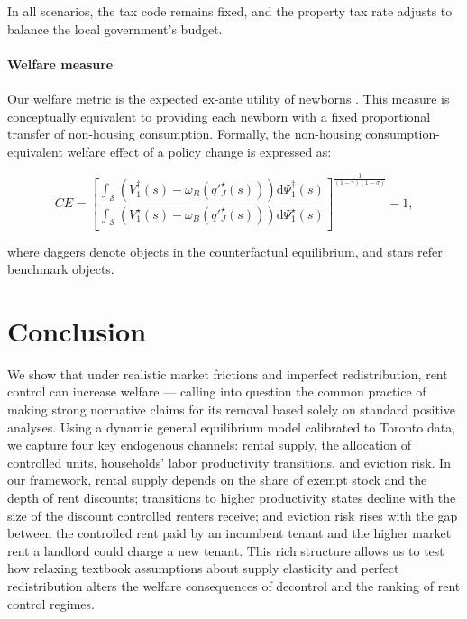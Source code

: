 \documentclass[parskip=full]{article}
\begin{document}
In all scenarios, the tax code remains fixed, and the property tax rate adjusts to balance the local government's budget.

\paragraph{Welfare measure} Our welfare metric is the expected ex-ante utility of newborns \citep{ralws-1971,conesa-et-al,gkkoc}. This measure is conceptually equivalent to providing each newborn with a fixed proportional transfer of non-housing consumption. Formally, the non-housing consumption-equivalent welfare effect of a policy change is expressed as:

\begin{equation}
  CE = \left[\frac{\int_{\mathcal{S}}\left(V^{\dagger}_{1}(s)-\omega_{B}\left(q'^{\star}_{J}(s)\right)\right)\mathrm{d}\Psi^{\dagger}_{1}(s)}{\int_{\mathcal{S}}\left(V^{\star}_{1}(s)-\omega_{B}\left(q'^{\star}_{J}(s)\right)\right)\mathrm{d}\Psi^{\star}_{1}(s)}\right]^{\frac{1}{(1-\gamma)(1-\sigma)}}-1,
\end{equation}

\noindent where daggers denote objects in the counterfactual equilibrium, and stars refer benchmark objects. 

\section{Conclusion}\label{sec:conclusion}

We show that under realistic market frictions and imperfect redistribution, rent control can increase welfare — calling into question the common practice of making strong normative claims for its removal based solely on standard positive analyses. Using a dynamic general equilibrium model calibrated to Toronto data, we capture four key endogenous channels: rental supply, the allocation of controlled units, households’ labor productivity transitions, and eviction risk. In our framework, rental supply depends on the share of exempt stock and the depth of rent discounts; transitions to higher productivity states decline with the size of the discount controlled renters receive; and eviction risk rises with the gap between the controlled rent paid by an incumbent tenant and the higher market rent a landlord could charge a new tenant. This rich structure allows us to test how relaxing textbook assumptions about supply elasticity and perfect redistribution alters the welfare consequences of decontrol and the ranking of rent control regimes.
\end{document}
